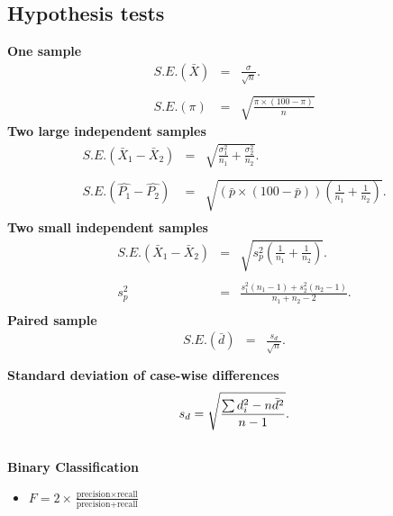 \subsection*{Hypothesis tests}
{\bf One sample}
\begin{eqnarray*}
S.E.(\bar{X})&=&\frac{\sigma}{\sqrt{n}}.\\\\
S.E.(\pi)&=&\sqrt{\frac{\pi\times(100-\pi)}{n}}
\end{eqnarray*}
{\bf Two large independent samples}
\begin{eqnarray*}
S.E.(\bar{X}_1-\bar{X}_2)&=&\sqrt{\frac{\sigma^2_1}{n_1}+\frac{\sigma_2^2}{n_2}}.\\\\
S.E.(\hat{P_1}-\hat{P_2})&=&\sqrt{\left(\bar{p}\times(100-\bar{p})\right)\left(\frac{1}{n_1}+\frac{1}{n_2}\right)}.\\
\end{eqnarray*}
{\bf Two small independent samples}
\begin{eqnarray*}
S.E.(\bar{X}_1-\bar{X}_2)&=&\sqrt{s_p^2\left(\frac{1}{n_1}+\frac{1}{n_2}\right)}.\\\\
s_p^2&=&\frac{s_1^2(n_1-1)+s_2^2(n_2-1)}{n_1+n_2-2}.\\
\end{eqnarray*}
{\bf Paired sample}
\begin{eqnarray*}
S.E.(\bar{d})&=&\frac{s_d}{\sqrt{n}}.\\\\
\end{eqnarray*}
{\bf Standard deviation of case-wise differences}
\begin{eqnarray*}
s_d = \sqrt{ {\sum d_i^2 - n\bar{d}^2 \over n-1}}.\\\\
\end{eqnarray*}
{\bf Binary Classification}
\begin{itemize}
\item $F = 2 \times \frac{\mbox{precision} \times \mbox{recall}}{ \mbox{precision} + \mbox{recall}}$

\end{itemize}




